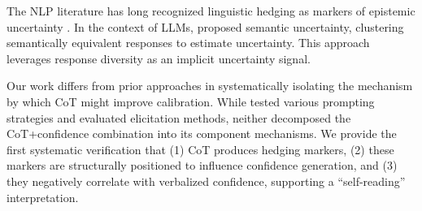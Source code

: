 The NLP literature has long recognized linguistic hedging as markers of epistemic uncertainty \citep{hyland1998hedging}. In the context of LLMs, \citet{kuhn2023semantic} proposed semantic uncertainty, clustering semantically equivalent responses to estimate uncertainty. This approach leverages response diversity as an implicit uncertainty signal.

Our work differs from prior approaches in systematically isolating the mechanism by which CoT might improve calibration. While \citet{tian2023just} tested various prompting strategies and \citet{xiong2023can} evaluated elicitation methods, neither decomposed the CoT+confidence combination into its component mechanisms. We provide the first systematic verification that (1) CoT produces hedging markers, (2) these markers are structurally positioned to influence confidence generation, and (3) they negatively correlate with verbalized confidence, supporting a ``self-reading'' interpretation.

